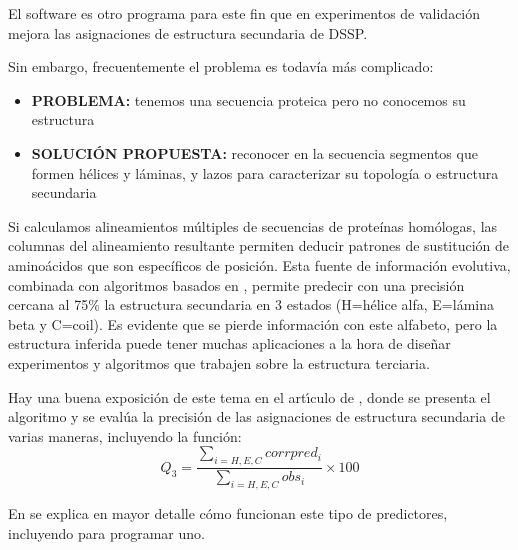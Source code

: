 El software  \citep{Frishman1995} es otro programa para este fin 
que en experimentos de validaci\'{o}n mejora las asignaciones de estructura secundaria de DSSP.

Sin embargo, frecuentemente el problema es todav\'{i}a m\'{a}s complicado:
\begin{itemize}
\item \textbf{PROBLEMA:} tenemos una secuencia proteica pero no conocemos su estructura 
\item \textbf{SOLUCI\'{O}N PROPUESTA:} reconocer en la secuencia segmentos que formen h\'{e}lices y l\'{a}minas, y lazos 
para caracterizar su topolog\'{i}a o estructura secundaria 
\end{itemize} 

Si calculamos alineamientos m\'{u}ltiples de secuencias de prote\'{i}nas hom\'{o}logas,
las columnas del alineamiento resultante permiten deducir patrones de sustituci\'{o}n de amino\'{a}cidos
que son espec\'{i}ficos de posici\'{o}n. Esta fuente de informaci\'{o}n evolutiva,
combinada con algoritmos basados en ,
permite predecir con una precisi\'{o}n cercana al 75\% la estructura secundaria en 3 estados (H=h\'{e}lice alfa, E=l\'{a}mina beta y C=coil).
Es evidente que se pierde informaci\'{o}n con este alfabeto, pero la estructura inferida puede tener muchas aplicaciones a la hora de dise\~nar 
experimentos y algoritmos que trabajen sobre la estructura terciaria. 

Hay una buena exposici\'{o}n de este tema en el art\'\i{}culo de \cite{Jones1999}, 
donde se presenta el algoritmo 
y se eval\'{u}a la precisi\'{o}n de las asignaciones de estructura secundaria de varias maneras, incluyendo la funci\'{o}n:
\begin{equation}
Q_{3} = \frac{\sum\limits_{i=H,E,C}{corrpred_{i}}}{\sum\limits_{i=H,E,C}{obs_{i}}} \times 100
\end{equation}

En \citet{Jurtz2017} se explica en mayor detalle c\'{o}mo funcionan este tipo de predictores, 
incluyendo 
para programar uno.


